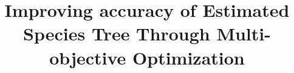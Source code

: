 \documentclass[runningheads]{llncs}
\begin{document}
%
\title{Improving accuracy of Estimated Species Tree Through Multi-objective Optimization}
\author{}
\institute{}
%
\maketitle              %
%

 
 
 






%
%
%


\end{document}
